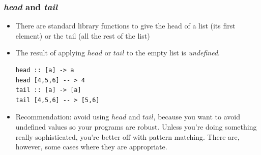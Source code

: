 \documentclass{beamer}
\begin{document}
\begin{frame}[fragile]
\frametitle{\emph{head} and \emph{tail}}

\begin{itemize}
\item There are standard library functions to give the head of a
  list (its first element) or the tail (all the rest of the list)
\item The result of applying $head$ or $tail$ to the empty list is
  \emph{undefined}.


\begin{verbatim}
head :: [a] -> a
head [4,5,6] -- > 4
tail :: [a] -> [a]
tail [4,5,6] -- > [5,6]
\end{verbatim}


\item Recommendation:  avoid using $head$ and $tail$, because you
  want to avoid undefined values so your programs are robust.
  Unless you're doing something really sophisticated, you're better
  off with pattern matching.  There are, however, some cases where they are appropriate.
\end{itemize}

\end{frame}
\end{document}
